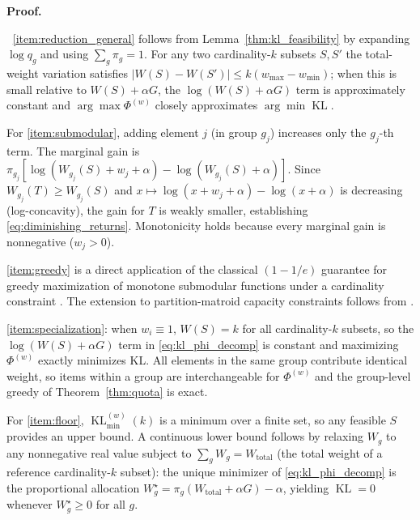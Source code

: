 \documentclass[10pt,journal]{IEEEtran}
\makeatletter
\newcommand{\1}{\mathbf{1}}
\DeclareMathOperator{\KL}{KL}
\theoremstyle{ieeethm}
\renewcommand{\IEEEproofname}{Proof}
\renewenvironment{IEEEproof}[1][\IEEEproofname]{%
  \par\pushQED{\IEEEQED}%
  \normalfont
  \topsep6\p@\@plus6\p@\relax
  \trivlist
  \item[]\textbf{#1.}\ignorespaces
}{%
  \popQED\endtrivlist\@endpefalse
}
\makeatother
\begin{document}
\begin{IEEEproof}
$\;\;$\ref{item:reduction_general} follows from Lemma~\ref{thm:kl_feasibility} by expanding
$\log q_g$ and using $\sum_g\pi_g=1$. For any two cardinality-$k$ subsets $S,S'$ the total-weight
variation satisfies $|W(S)-W(S')|\le k(w_{\max}-w_{\min})$; when this is small relative to
$W(S)+\alpha G$, the $\log(W(S)+\alpha G)$ term is approximately constant and
$\arg\max\Phi^{(w)}$ closely approximates $\arg\min\KL$.

For \ref{item:submodular}, adding element $j$ (in group $g_j$) increases only the $g_j$-th
term. The marginal gain is
$\pi_{g_j}[\log(W_{g_j}(S)+w_j+\alpha)-\log(W_{g_j}(S)+\alpha)]$.
Since $W_{g_j}(T)\ge W_{g_j}(S)$ and $x\mapsto\log(x+w_j+\alpha)-\log(x+\alpha)$ is
decreasing (log-concavity), the gain for $T$ is weakly smaller, establishing
\eqref{eq:diminishing_returns}. Monotonicity holds because every marginal gain is
nonnegative ($w_j>0$).

\ref{item:greedy} is a direct application of the classical $(1-1/e)$ guarantee for greedy
maximization of monotone submodular functions under a cardinality constraint
\cite{nemhauser1978submodular}. The extension to partition-matroid capacity constraints
follows from \cite{calinescu2011matroid,fisher1978submodular}.

\ref{item:specialization}: when $w_i\equiv 1$, $W(S)=k$ for all cardinality-$k$ subsets,
so the $\log(W(S)+\alpha G)$ term in \eqref{eq:kl_phi_decomp} is constant and maximizing
$\Phi^{(w)}$ exactly minimizes KL. All elements in the same group contribute identical
weight, so items within a group are interchangeable for $\Phi^{(w)}$ and the group-level
greedy of Theorem~\ref{thm:quota} is exact.

For \ref{item:floor}, $\KL^{(w)}_{\min}(k)$ is a minimum over a finite set, so any feasible
$S$ provides an upper bound. A continuous lower bound follows by relaxing $W_g$ to any
nonnegative real value subject to $\sum_g W_g=W_{\mathrm{total}}$ (the total weight of a
reference cardinality-$k$ subset): the unique minimizer of \eqref{eq:kl_phi_decomp} is the
proportional allocation $W_g^\star=\pi_g(W_{\mathrm{total}}+\alpha G)-\alpha$, yielding
$\KL=0$ whenever $W_g^\star\ge 0$ for all $g$.
\end{IEEEproof}
\end{document}

